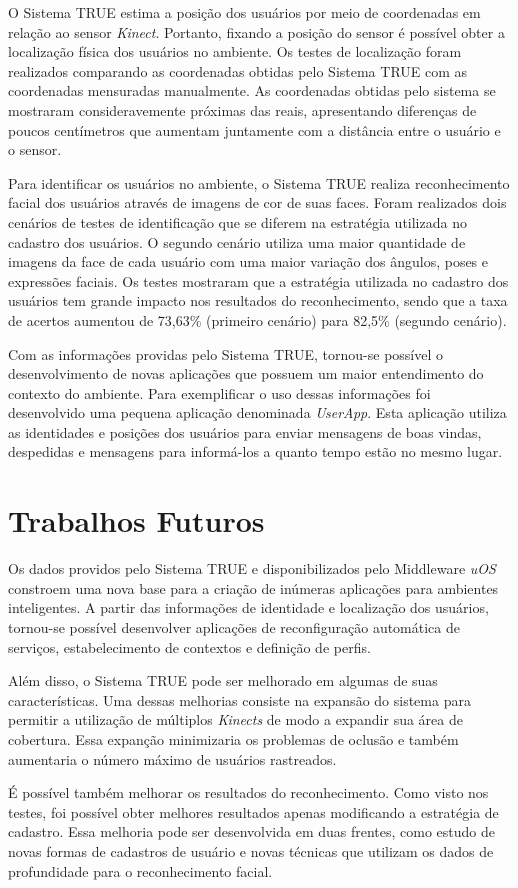 O Sistema TRUE estima a posição dos usuários por meio de coordenadas em relação ao sensor \textit{Kinect}. Portanto, fixando a posição do sensor é possível obter a localização física dos usuários no ambiente. Os testes de localização foram realizados comparando as coordenadas obtidas pelo Sistema TRUE com as coordenadas mensuradas manualmente. As coordenadas obtidas pelo sistema se mostraram consideravemente próximas das reais, apresentando diferenças de poucos centímetros que aumentam juntamente com a distância entre o usuário e o sensor. 

Para identificar os usuários no ambiente, o Sistema TRUE realiza reconhecimento facial dos usuários através de imagens de cor de suas faces. Foram realizados dois cenários de testes de identificação que se diferem na estratégia utilizada no cadastro dos usuários. O segundo cenário utiliza uma maior quantidade de imagens da face de cada usuário com uma maior variação dos ângulos, poses e expressões faciais. Os testes mostraram que a estratégia utilizada no cadastro dos usuários tem grande impacto nos resultados do reconhecimento, sendo que a taxa de acertos aumentou de 73,63\% (primeiro cenário) para 82,5\% (segundo cenário).

Com as informações providas pelo Sistema TRUE, tornou-se possível o desenvolvimento de novas aplicações que possuem um maior entendimento do contexto do ambiente. Para exemplificar o uso dessas informações foi desenvolvido uma pequena aplicação denominada \textit{UserApp}. Esta aplicação utiliza as identidades e posições dos usuários para enviar mensagens de boas vindas, despedidas e mensagens para informá-los a quanto tempo estão no mesmo lugar.

\section{Trabalhos Futuros}

Os dados providos pelo Sistema TRUE e disponibilizados pelo Middleware \textit{uOS} constroem uma nova base para a criação de inúmeras aplicações para ambientes inteligentes. A partir das informações de identidade e localização dos usuários, tornou-se possível desenvolver aplicações de reconfiguração automática de serviços, estabelecimento de contextos e definição de perfis.

Além disso, o Sistema TRUE pode ser melhorado em algumas de suas características. Uma dessas melhorias consiste na expansão do sistema para permitir a utilização de múltiplos \textit{Kinects} de modo a expandir sua área de cobertura. Essa expanção minimizaria os problemas de oclusão e também aumentaria o número máximo de usuários rastreados.


É possível também melhorar os resultados do reconhecimento. Como visto nos testes, foi possível obter melhores resultados apenas modificando a estratégia de cadastro. Essa melhoria pode ser desenvolvida em duas frentes, como estudo de novas formas de cadastros de usuário e novas técnicas que utilizam os dados de profundidade para o reconhecimento facial.





